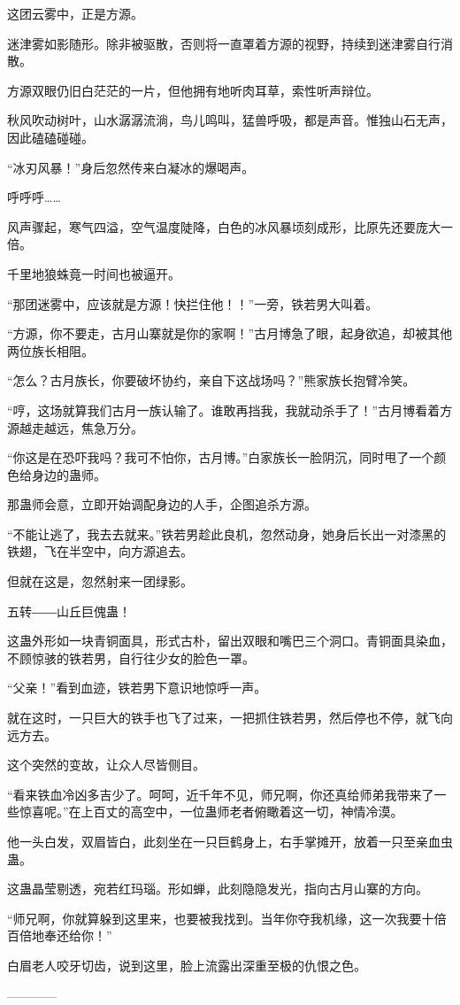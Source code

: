 \begin{this_body}
这团云雾中，正是方源。

迷津雾如影随形。除非被驱散，否则将一直罩着方源的视野，持续到迷津雾自行消散。

方源双眼仍旧白茫茫的一片，但他拥有地听肉耳草，索性听声辩位。

秋风吹动树叶，山水潺潺流淌，鸟儿鸣叫，猛兽呼吸，都是声音。惟独山石无声，因此磕磕碰碰。

“冰刃风暴！”身后忽然传来白凝冰的爆喝声。

呼呼呼……

风声骤起，寒气四溢，空气温度陡降，白色的冰风暴顷刻成形，比原先还要庞大一倍。

千里地狼蛛竟一时间也被逼开。

“那团迷雾中，应该就是方源！快拦住他！！”一旁，铁若男大叫着。

“方源，你不要走，古月山寨就是你的家啊！”古月博急了眼，起身欲追，却被其他两位族长相阻。

“怎么？古月族长，你要破坏协约，亲自下这战场吗？”熊家族长抱臂冷笑。

“哼，这场就算我们古月一族认输了。谁敢再挡我，我就动杀手了！”古月博看着方源越走越远，焦急万分。

“你这是在恐吓我吗？我可不怕你，古月博。”白家族长一脸阴沉，同时甩了一个颜色给身边的蛊师。

那蛊师会意，立即开始调配身边的人手，企图追杀方源。

“不能让逃了，我去去就来。”铁若男趁此良机，忽然动身，她身后长出一对漆黑的铁翅，飞在半空中，向方源追去。

但就在这是，忽然射来一团绿影。

五转――山丘巨傀蛊！

这蛊外形如一块青铜面具，形式古朴，留出双眼和嘴巴三个洞口。青铜面具染血，不顾惊骇的铁若男，自行往少女的脸色一罩。

“父亲！”看到血迹，铁若男下意识地惊呼一声。

就在这时，一只巨大的铁手也飞了过来，一把抓住铁若男，然后停也不停，就飞向远方去。

这个突然的变故，让众人尽皆侧目。

“看来铁血冷凶多吉少了。呵呵，近千年不见，师兄啊，你还真给师弟我带来了一些惊喜呢。”在上百丈的高空中，一位蛊师老者俯瞰着这一切，神情冷漠。

他一头白发，双眉皆白，此刻坐在一只巨鹤身上，右手掌摊开，放着一只至亲血虫蛊。

这蛊晶莹剔透，宛若红玛瑙。形如蝉，此刻隐隐发光，指向古月山寨的方向。

“师兄啊，你就算躲到这里来，也要被我找到。当年你夺我机缘，这一次我要十倍百倍地奉还给你！”

白眉老人咬牙切齿，说到这里，脸上流露出深重至极的仇恨之色。

------------

\end{this_body}

